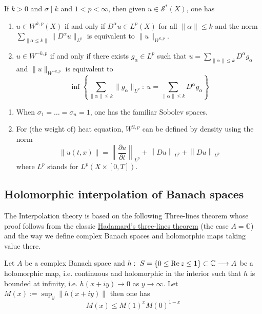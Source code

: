 \begin{theorem}
\label{thm:equiv-norm-Sobolev}
If \(k>0\) and \(\sigma \mid k\) and \(1<p<\infty\), then given \(u\in
\mathcal{S}^*(X)\), one has
\begin{enumerate}
\item \(u\in W^{k,p}(X)\) if and only if \(D^\alpha u\in L^p(X)\) for all \(\|\alpha\|\leq k\) and the norm \(\sum_{\| \alpha \leq k\|} \|D^\alpha u\|_{L^p}\) is equivalent to \(\|u\|_{W^{k,p}}\).
\item \(u\in W^{-k,p}\) if and only if there exists \(g_\alpha\in L^p\) such that \(u =
   \sum_{\|\alpha\|\leq k} D^\alpha g_\alpha\) and \(\|u\|_{W^{-k,p}}\) is equivalent
to
\[
    \inf \left\{ \sum_{\|\alpha\| \leq k} \|g_\alpha\|_{L^p}:\ u = \sum_{\|\alpha\|\leq k}
   D^\alpha g_\alpha \right\}
   \]
\end{enumerate}
\end{theorem}

\begin{exampl}
\begin{enumerate}
\item When \(\sigma_1=\dots=\sigma_n=1\), one has the familiar Sobolev spaces.
\item For (the weight of) heat equation, \(W^{2,p}\) can be defined by density using the
norm
\[
    \|u(t,x)\| = \left\|\frac{\partial u}{\partial t}\right\|_{L^p} +
   \left\|Du \right\|_{L^p} + \left\|D u\right\|_{L^p}
   \]
where \(L^p\) stands for \(L^p(X\times [0,T])\).
\end{enumerate}
\end{exampl}

\subsection{Holomorphic interpolation of Banach spaces}
\label{sec:orgf24d7d0}

The Interpolation theory is based on the following Three-lines theorem whose proof follows
from the classic \href{https://en.wikipedia.org/wiki/Hadamard\_three-lines\_theorem}{Hadamard's three-lines theorem} (the case \(A=\mathbb{C}\)) and the way we
define complex Banach spaces and holomorphic maps taking value there.

\begin{theorem}
\label{thm:3-line}
Let \(A\) be a complex Banach space and \(h:\ S=\left \{0\leq \mathop{\rm Re}\nolimits z\leq 1\right\}\subset
\mathbb{C} \longrightarrow  A\) be a holomorphic map, i.e. continuous and
holomorphic in the interior such that \(h\) is bounded at infinity, i.e. \(h(x+iy)
\to 0\) as \(y \to \infty\). Let \(M(x):=\sup_y \|h(x+iy)\|\) then one has
\[
 M(x)\leq M(1)^x M(0)^{1-x}
\]
\end{theorem}

